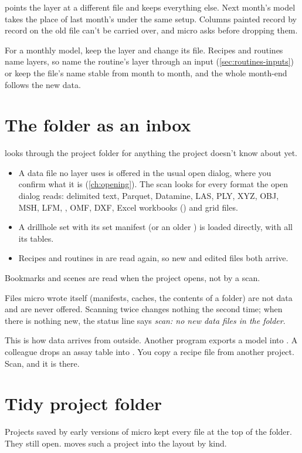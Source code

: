  points the layer at a different file and keeps everything else. Next month's model takes the place of last month's under the same setup. Columns painted record by record on the old file can't be carried over, and micro asks before dropping them.

\begin{tip}
For a monthly model, keep the layer and change its file. Recipes and routines name layers, so name the routine's layer through an input (\cref{sec:routines-inputs}) or keep the file's name stable from month to month, and the whole month-end follows the new data.
\end{tip}

\section{The folder as an inbox}\label{sec:projects-inbox}
 looks through the project folder for anything the project doesn't know about yet.

\begin{itemize}
\item A data file no layer uses is offered in the usual open dialog, where you confirm what it is (\cref{ch:opening}). The scan looks for every format the open dialog reads: delimited text, Parquet, Datamine, LAS, PLY, XYZ, OBJ, MSH, LFM, , OMF, DXF, Excel workbooks () and grid files.
\item A drillhole set with its set manifest (or an older ) is loaded directly, with all its tables.
\item Recipes and routines in  are read again, so new and edited files both arrive.
\end{itemize}

Bookmarks and scenes are read when the project opens, not by a scan.

Files micro wrote itself (manifests, caches, the contents of a  folder) are not data and are never offered. Scanning twice changes nothing the second time; when there is nothing new, the status line says \emph{scan: no new data files in the folder}.

This is how data arrives from outside. Another program exports a model into . A colleague drops an assay table into . You copy a recipe file from another project. Scan, and it is there.

\section{Tidy project folder}\label{sec:projects-tidy}
Projects saved by early versions of micro kept every file at the top of the folder. They still open.  moves such a project into the layout by kind.

